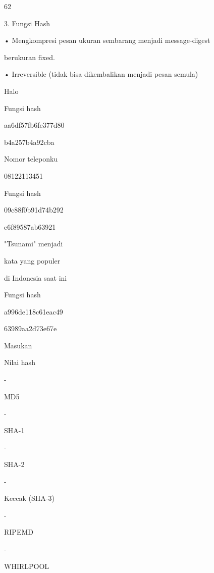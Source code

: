 \documentclass{article}
\begin{document}

62

3. Fungsi Hash

• Mengkompresi pesan ukuran sembarang menjadi message-digest 

berukuran fixed.

• Irreversible (tidak bisa dikembalikan menjadi pesan semula)


Halo

Fungsi hash

aa6df57fb6fe377d80

b4a257b4a92cba

Nomor teleponku

08122113451

Fungsi hash

09c88f0b91d74b292

e6f89587ab63921

"Tsunami" menjadi

kata yang populer

di Indonesia saat ini

Fungsi hash

a996de118c61eac49

63989aa2d73e67e

Masukan

Nilai hash

-

MD5

-

SHA-1

-

SHA-2

-

Keccak (SHA-3)

-

RIPEMD

-

WHIRLPOOL
\end{document}
